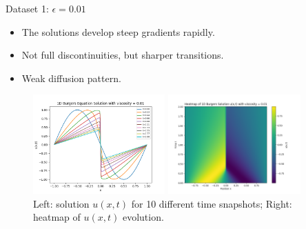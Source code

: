 \begin{secframe}

\begin{block}{Dataset 1: $\epsilon = 0.01$}
\begin{itemize}
  \item \small The solutions develop steep gradients rapidly.
  \item \small Not full discontinuities, but sharper transitions.
  \item \small Weak diffusion pattern.
\end{itemize}
\end{block}

\begin{figure}[h!]
    \centering
    \begin{minipage}[t]{0.48\linewidth}
        \centering
        \includegraphics[height=3.8cm]{images/burger/graphical_visualization_1DBurgers_visc_001.png}
    \end{minipage}\hfill
    \begin{minipage}[t]{0.48\linewidth}
        \centering
        \includegraphics[height=3.8cm]{images/burger/Heatmap_1DBurgers_visc_001.png}
    \end{minipage}
    \caption{\scriptsize Left: solution $u(x,t)$ for 10 different time snapshots; Right: heatmap of $u(x,t)$ evolution.}
\end{figure}

\end{secframe}

